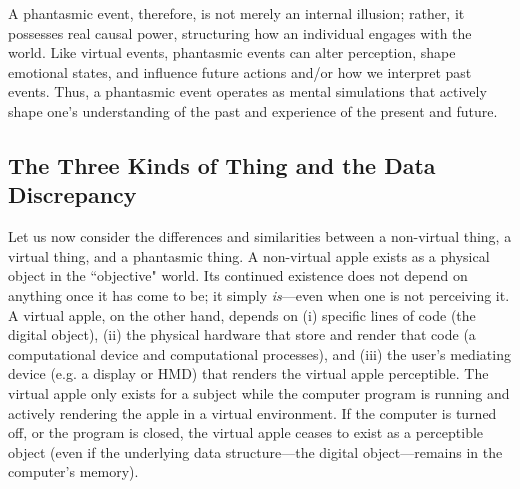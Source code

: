 \documentclass{article}
\begin{document}
A phantasmic event, therefore, is not merely an internal illusion; rather, it possesses real causal power, structuring how an individual engages with the world. Like virtual events, phantasmic events can alter perception, shape emotional states, and influence future actions and/or how we interpret past events. Thus, a phantasmic event operates as mental simulations that actively shape one's understanding of the past and experience of the present and future.

\subsection*{The Three Kinds of Thing and the Data Discrepancy}

Let us now consider the differences and similarities between a non-virtual thing, a virtual thing, and a phantasmic thing. A non-virtual apple exists as a physical object in the “objective" world. Its continued existence does not depend on anything once it has come to be; it simply \textit{is}—even when one is not perceiving it. A virtual apple, on the other hand, depends on (i) specific lines of code (the digital object), (ii) the physical hardware that store and render that code (a computational device and computational processes), and (iii) the user's mediating device (e.g. a display or HMD) that renders the virtual apple perceptible. The virtual apple only exists for a subject while the computer program is running and actively rendering the apple in a virtual environment. If the computer is turned off, or the program is closed, the virtual apple ceases to exist as a perceptible object (even if the underlying data structure—the digital object—remains in the computer's memory).
\end{document}
